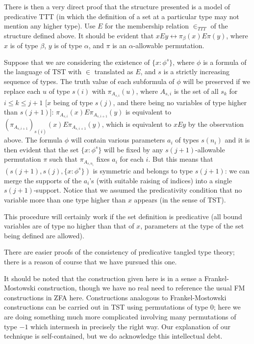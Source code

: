 \documentclass[112pt]{article}
\begin{document}
There is then a very direct proof that the structure presented is a model of predicative TTT (in which the definition of a set at a particular type may not mention any higher type).  Use $E$ for the membership relation $\in_{TTT}$ of the structure defined above.  It should be evident that $x E y \leftrightarrow \pi_\beta(x) E \pi(y)$,
where $x$ is of type $\beta$, $y$ is of type $\alpha$, and $\pi$ is an $\alpha$-allowable permutation.

Suppose that we are considering the existence of $\{x : \phi^s\}$, where $\phi$ is a formula of the language of TST with $\in$ translated as $E$, and $s$ is a strictly increasing sequence of types.  The truth value of each subformula of $\phi$ will be preserved if we replace each $u$ of type $s(i)$ with $\pi_{A_{s,i}}(u)$, where  $A_{s,i}$ is the set of all $s_k$ for $i \leq k \leq j+1$ [$x$ being of type $s(j)$, and there being no variables of type higher than $s(j+1)$]:  $\pi_{A_{s,i}}(x) E  \pi_{A_{s,i+1}}(y)$ is equivalent to $(\pi_{A_{s,i+1}})_{s(i)}(x) E \pi_{A_{s,i+1}}(y)$, which is equivalent to $xEy$ by the observation above. The formula $\phi$ will contain various parameters $a_i$ of types $s(n_i)$ and it is then evident that the set $\{x : \phi^s\}$ will be fixed by any $s(j+1)$-allowable permutation $\pi$ such that $\pi_{A_{s,n_i}}$ fixes $a_i$ for each $i$.  But this means that
$(s(j+1),s(j),\{x : \phi^s\})$ is symmetric and belongs to type $s(j+1)$:  we can merge the supports of the $a_i$'s (with suitable raising of indices) into a single $s(j+1)$-support.  Notice that we assumed the predicativity condition that no variable more than one type higher than $x$ appears (in the sense of TST).

This procedure will certainly work if the set definition is predicative (all bound variables are of type no higher than that of $x$, parameters at the type
of the set being defined are allowed).

There are easier proofs of the consistency of predicative tangled type theory;  there is a reason of course that we have pursued this one.

It should be noted that the construction given here is in a sense a Frankel-Mostowski construction, though we have no real need to reference the usual
FM constructions in ZFA here.  Constructions analogous to Frankel-Mostowski constructions can be carried out in TST using permutations of type 0;  here we are doing something much more complicated involving many permutations of type $-1$ which intermesh in precisely the right way.  Our explanation of our technique is self-contained, but we do acknowledge this intellectual debt.
\end{document}
